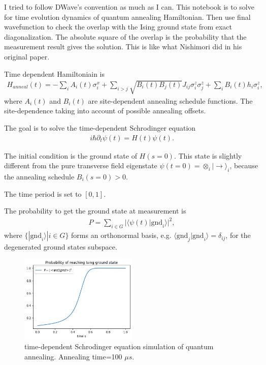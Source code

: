 \documentclass[]{article}
\begin{document}
I tried to follow DWave's convention as much as I can.
This notebook is to solve for time evolution dynamics of quantum annealing Hamiltonian. Then use final wavefunction to check the overlap with the Ising ground state from exact diagonalization. The absolute square of the overlap is the probability that the measurement result gives the solution. This is like what Nishimori did in his original paper.

Time dependent Hamiltoniain is
\begin{align}
\label{eq:annealH}
H_{anneal}(t) =  - \sum_i  A_i(t)\sigma^x_i +  \sum_{i>j} \sqrt{B_{i}(t)B_{j}(t)} J_{ij} \sigma^z_i \sigma^z_j +\sum_i B_{i}(t) h_i \sigma^z_i  ,
\end{align}
where $A_i(t)$ and $B_{i}(t)$ are site-dependent annealing schedule functions. The site-dependence taking into account of possible annealing offsets.

The goal is to solve the time-dependent Schrodinger equation 
\begin{align}
i \hbar \partial_t \psi(t) = H(t) \psi(t) .
\end{align}

The initial condition is the ground state of $H(s=0)$. This state is slightly different from the pure transverse  field eigenstate $\psi(t=0)= \otimes_i  |\rightarrow \rangle_i$, because the annealing schedule $B_i(s=0)> 0$.

The time period is set to $[0,1]$. 

The probability to get the ground state at measurement is
\begin{align}
P =\sum_{i\in G} | \langle \psi (t)  | \mbox{gnd}_i \rangle |^2 ,
\end{align}
where $\{ | \mbox{gnd}_i \rangle | i \in G \}$ forms an orthonormal basis, e.g. $\langle \mbox{gnd}_j | \mbox{gnd}_i \rangle = \delta_{ij}$,  for the degenerated ground states subspace.


\begin{figure}[htb]
	\centering
	\includegraphics[width=0.5\textwidth]{probt.png}
	\caption{
		\label{tdse} time-dependent Schrodinger equation simulation of quantum annealing. Annealing time=100 $\mu s$.
	}
\end{figure}
\end{document}

